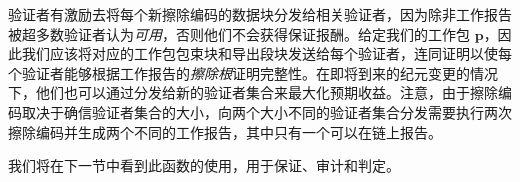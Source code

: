 验证者有激励去将每个新擦除编码的数据块分发给相关验证者，因为除非工作报告被超多数验证者认为\emph{可用}，否则他们不会获得保证报酬。给定我们的工作包 $\mathbf{p}$，因此我们应该将对应的工作包包束块和导出段块发送给每个验证者，连同证明以使每个验证者能够根据工作报告的\emph{擦除根}证明完整性。在即将到来的纪元变更的情况下，他们也可以通过分发给新的验证者集合来最大化预期收益。注意，由于擦除编码取决于确信验证者集合的大小，向两个大小不同的验证者集合分发需要执行两次擦除编码并生成两个不同的工作报告，其中只有一个可以在链上报告。

我们将在下一节中看到此函数的使用，用于保证、审计和判定。

\undef{\newavailabilityspecifier}
\undef{\itemtodigest}
\undef{\countupexports}
\undef{\importsegmentdata}
\undef{\pagedproofs}
\undef{\marshallrefine}
\undef{\extrinsicdata}
\undef{\segsX}
